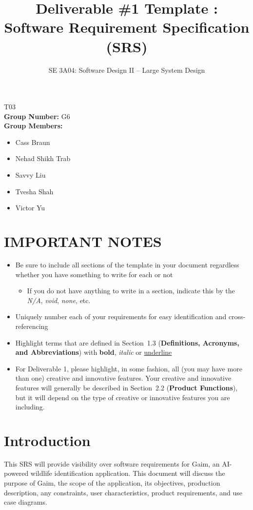 \documentclass[]{article}
\title{Deliverable \#1 Template : Software Requirement Specification (SRS)}
\author{SE 3A04: Software Design II -- Large System Design}
\date{}
\begin{document}
\maketitle	
{} T03\\
{\bf Group Number:} G6 \\
{\bf Group Members:} 
\begin{itemize}
	\item Cass Braun
	\item Nehad Shikh Trab
	\item Savvy Liu
	\item Tvesha Shah
	\item Victor Yu
\end{itemize}

\section*{IMPORTANT NOTES}
\begin{itemize}
	\item Be sure to include all sections of the template in your document regardless whether you have something to write for each or not
	\begin{itemize}
		\item If you do not have anything to write in a section, indicate this by the \emph{N/A}, \emph{void}, \emph{none}, etc.
	\end{itemize}
	\item Uniquely number each of your requirements for easy identification and cross-referencing
	\item Highlight terms that are defined in Section~1.3 (\textbf{Definitions, Acronyms, and Abbreviations}) with \textbf{bold}, \emph{italic} or \underline{underline}
	\item For Deliverable 1, please highlight, in some fashion, all (you may have more than one) creative and innovative features. Your creative and innovative features will generally be described in Section~2.2 (\textbf{Product Functions}), but it will depend on the type of creative or innovative features you are including.
\end{itemize}

\newpage
\section{Introduction}
\label{sec:introduction}

This SRS will provide visibility over software requirements for Gaim, an AI-powered wildlife identification application. This document will discuss the purpose of Gaim, the scope of the application, its objectives, production description, any constraints, user characteristics, product requirements, and use case diagrams.
\end{document}
